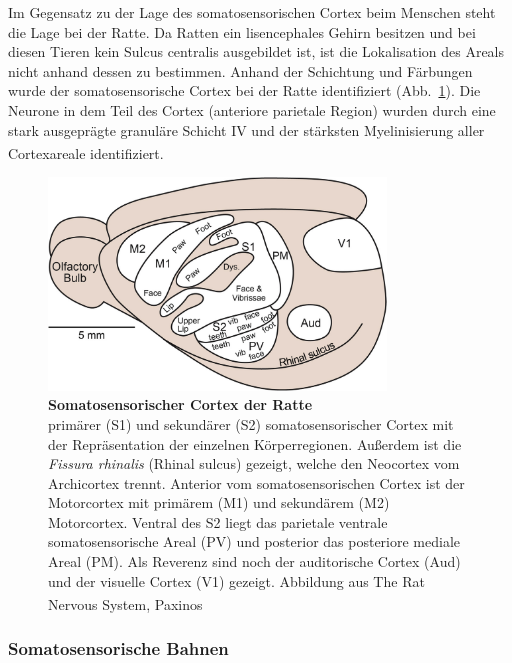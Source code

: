 \documentclass[12pt,a4paper,pdftex]{article}
\begin{document}
Im Gegensatz zu der Lage des somatosensorischen Cortex beim Menschen steht die Lage bei der Ratte. Da Ratten ein lisencephales Gehirn besitzen und bei diesen Tieren kein Sulcus centralis ausgebildet ist, ist die Lokalisation des Areals nicht anhand dessen zu bestimmen. Anhand der Schichtung und Färbungen wurde der somatosensorische Cortex bei der Ratte identifiziert (Abb.~\ref{fig:S1_Cortex_Ratte}). Die Neurone in dem Teil des Cortex (anteriore parietale Region) wurden durch eine stark ausgeprägte granuläre Schicht IV und der stärksten Myelinisierung aller Cortexareale identifiziert. \textsuperscript{\cite[22]{paxinos2014rat}}
\\
\begin{figure}[H]
    \centering
    \includegraphics[width = 0.8\textwidth] {pictures/somatosensory/Somato_cortex_ratte.png}
    \caption[Somatosensorischer Cortex der Ratte]{\textbf{Somatosensorischer Cortex der Ratte}\\
    primärer (S1) und sekundärer (S2) somatosensorischer Cortex mit der Repräsentation der einzelnen Körperregionen. Außerdem ist die \textit{Fissura rhinalis} (Rhinal sulcus) gezeigt, welche den Neocortex vom Archicortex trennt. Anterior vom somatosensorischen Cortex ist der Motorcortex mit primärem (M1) und sekundärem (M2) Motorcortex. Ventral des S2 liegt das parietale ventrale somatosensorische Areal (PV) und posterior das posteriore mediale Areal (PM). Als Reverenz sind noch der auditorische Cortex (Aud) und der visuelle Cortex (V1) gezeigt. Abbildung aus The Rat Nervous System, Paxinos \textsuperscript{\cite[24]{paxinos2014rat}}}
    \label{fig:S1_Cortex_Ratte}
\end{figure}

\subsubsection*{Somatosensorische Bahnen}
\end{document}
